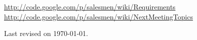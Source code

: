 \documentclass[a4paper, 12pt]{article}
\begin{document}
			
		
	
	
	\begin{thebibliography}{99}
		\href{http://code.google.com/p/salesmen/wiki/Requirements}{http://code.google.com/p/salesmen/wiki/Requirements}
		\href{http://code.google.com/p/salesmen/wiki/NextMeetingTopics}{http://code.google.com/p/salesmen/wiki/NextMeetingTopics}

		
	\end{thebibliography}	
	
	\begin{center}
	 	Last revised on \today.
	\end{center}
	
	
\end{document}
